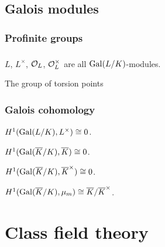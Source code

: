 \documentclass{../../large}
\begin{document}
\chapter{Galois modules}
\section{Profinite groups}

\section{}

\begin{prb}
\begin{parts}
\item $L$, $L^\times$, $\mathcal{O}_L$, $\mathcal{O}_L^\times$ are all $\operatorname{Gal}(L/K)$-modules.
\item The group of torsion points
\end{parts}
\end{prb}

\begin{prb}
\end{prb}


\section{Galois cohomology}
\begin{prb}
\end{prb}

\begin{prb}
\end{prb}

\begin{prb}[Hilbert 90]
\begin{parts}
\item $H^1(\operatorname{Gal}(L/K),L^\times)\cong0$.
\item $H^1(\operatorname{Gal}(\overline K/K),\overline K)\cong0$.
\item $H^1(\operatorname{Gal}(\overline K/K),\overline K^\times)\cong0$.
\item $H^1(\operatorname{Gal}(\overline K/K),\mu_m)\cong\overline K/\overline K^\times$.
\end{parts}
\end{prb}
\begin{pf}
\end{pf}





\part{Class field theory}
\end{document}
